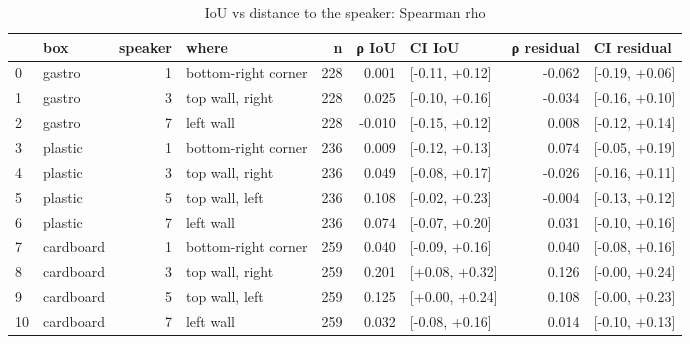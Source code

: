 \begin{table}
\caption{IoU vs distance to the speaker: Spearman rho}
\label{tab:speaker_distance}
\begin{tabular}{llrlrrlrl}
\toprule
 & box & speaker & where & n & ρ IoU & CI IoU & ρ residual & CI residual \\
\midrule
0 & gastro & 1 & bottom-right corner & 228 & 0.001 & [-0.11, +0.12] & -0.062 & [-0.19, +0.06] \\
1 & gastro & 3 & top wall, right & 228 & 0.025 & [-0.10, +0.16] & -0.034 & [-0.16, +0.10] \\
2 & gastro & 7 & left wall & 228 & -0.010 & [-0.15, +0.12] & 0.008 & [-0.12, +0.14] \\
3 & plastic & 1 & bottom-right corner & 236 & 0.009 & [-0.12, +0.13] & 0.074 & [-0.05, +0.19] \\
4 & plastic & 3 & top wall, right & 236 & 0.049 & [-0.08, +0.17] & -0.026 & [-0.16, +0.11] \\
5 & plastic & 5 & top wall, left & 236 & 0.108 & [-0.02, +0.23] & -0.004 & [-0.13, +0.12] \\
6 & plastic & 7 & left wall & 236 & 0.074 & [-0.07, +0.20] & 0.031 & [-0.10, +0.16] \\
7 & cardboard & 1 & bottom-right corner & 259 & 0.040 & [-0.09, +0.16] & 0.040 & [-0.08, +0.16] \\
8 & cardboard & 3 & top wall, right & 259 & 0.201 & [+0.08, +0.32] & 0.126 & [-0.00, +0.24] \\
9 & cardboard & 5 & top wall, left & 259 & 0.125 & [+0.00, +0.24] & 0.108 & [-0.00, +0.23] \\
10 & cardboard & 7 & left wall & 259 & 0.032 & [-0.08, +0.16] & 0.014 & [-0.10, +0.13] \\
\bottomrule
\end{tabular}
\end{table}

